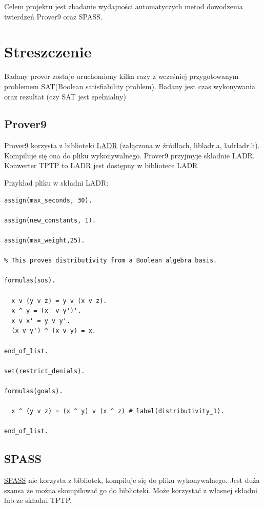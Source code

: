 \documentclass[a4paper,12pt]{article}
\begin{document}
Celem projektu jest zbadanie wydajności automatyczych metod dowodzenia twierdzeń Prover9 oraz SPASS.


\section{Streszczenie}

Badany prover zostaje uruchomiony kilka razy z wcześniej przygotowanym problemem SAT(Boolean satisfiability problem). Badany jest czas wykonywania oraz rezultat (czy SAT jest spełnialny)


\subsection{Prover9}
Prover9 korzysta z biblioteki \href{https://www.cs.unm.edu/~mccune/prover9/manual/2009-11A/}{LADR} (załączona w źródłach, libladr.a, ladrladr.h). Kompiluje się ona do pliku wykonywalnego.
Prover9 przyjmyje składnie LADR. Konwerter TPTP to LADR jest dostępny w bibliotece LADR

Przykład pliku w składni LADR:

\begin{verbatim}
assign(max_seconds, 30).

assign(new_constants, 1).

assign(max_weight,25).

% This proves distributivity from a Boolean algebra basis.

formulas(sos).

  x v (y v z) = y v (x v z).
  x ^ y = (x' v y')'.
  x v x' = y v y'.
  (x v y') ^ (x v y) = x.

end_of_list.

set(restrict_denials).

formulas(goals).

  x ^ (y v z) = (x ^ y) v (x ^ z) # label(distributivity_1).

end_of_list.
\end{verbatim}

\subsection{SPASS}
\href{https://webspass.spass-prover.org/}{SPASS} nie korzysta z bibliotek, kompiluje się do pliku wykonywalnego.
Jest duża szansa że można skompilować go do biblioteki. Może korzystać z własnej składni lub ze składni TPTP.
\end{document}
